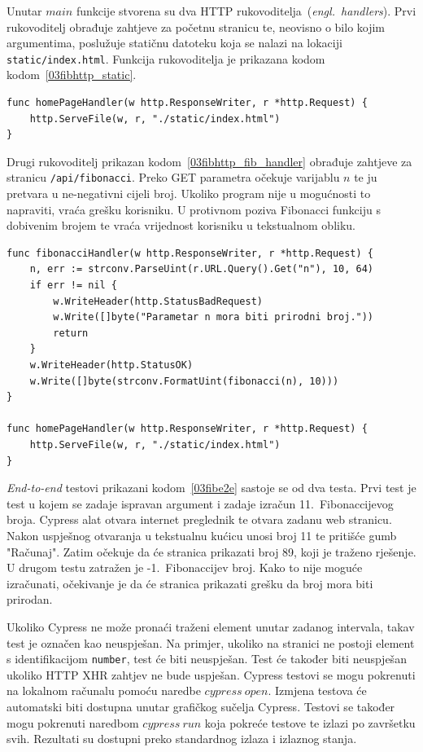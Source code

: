 Unutar $main$ funkcije stvorena su dva HTTP rukovoditelja~(\textit{engl.~handlers}). Prvi
rukovoditelj obrađuje zahtjeve za početnu stranicu te, neovisno o bilo kojim argumentima, poslužuje
statičnu datoteku koja se nalazi na lokaciji \texttt{static/index.html}. Funkcija rukovoditelja je
prikazana kodom kodom~\ref{03fibhttp_static}.
\begin{lstlisting}[float=h]
func homePageHandler(w http.ResponseWriter, r *http.Request) {
	http.ServeFile(w, r, "./static/index.html")
}
\end{lstlisting}

Drugi rukovoditelj prikazan kodom~\ref{03fibhttp_fib_handler} obrađuje zahtjeve za stranicu
\texttt{/api/fibonacci}. Preko GET parametra očekuje varijablu $n$ te ju pretvara u ne-negativni
cijeli broj. Ukoliko program nije u mogućnosti to napraviti, vraća grešku korisniku. U protivnom
poziva Fibonacci funkciju s dobivenim brojem te vraća vrijednost korisniku u tekstualnom obliku.

\begin{lstlisting}[float=h]
func fibonacciHandler(w http.ResponseWriter, r *http.Request) {
	n, err := strconv.ParseUint(r.URL.Query().Get("n"), 10, 64)
	if err != nil {
		w.WriteHeader(http.StatusBadRequest)
		w.Write([]byte("Parametar n mora biti prirodni broj."))
		return
	}
	w.WriteHeader(http.StatusOK)
	w.Write([]byte(strconv.FormatUint(fibonacci(n), 10)))
}

func homePageHandler(w http.ResponseWriter, r *http.Request) {
	http.ServeFile(w, r, "./static/index.html")
}
\end{lstlisting}

\textit{End-to-end} testovi prikazani kodom~\ref{03fibe2e} sastoje se od dva testa. Prvi test je
test u kojem se zadaje ispravan argument i zadaje izračun 11.~Fibonaccijevog broja. Cypress alat
otvara internet preglednik te otvara zadanu web stranicu. Nakon uspješnog otvaranja u tekstualnu
kućicu unosi broj 11 te pritišće gumb "Računaj". Zatim očekuje da će stranica prikazati broj 89,
koji je traženo rješenje. U drugom testu zatražen je -1.~Fibonaccijev broj. Kako to nije moguće
izračunati, očekivanje je da će stranica prikazati grešku da broj mora biti prirodan.

Ukoliko Cypress ne može pronaći traženi element unutar zadanog intervala, takav test je označen kao
neuspješan. Na primjer, ukoliko na stranici ne postoji element s identifikacijom \texttt{number},
test će biti neuspješan. Test će također biti neuspješan ukoliko HTTP XHR zahtjev ne bude uspješan.
Cypress testovi se mogu pokrenuti na lokalnom računalu pomoću naredbe $cypress~open$. Izmjena
testova će automatski biti dostupna unutar grafičkog sučelja Cypress. Testovi se također mogu
pokrenuti naredbom $cypress~run$ koja pokreće testove te izlazi po završetku svih. Rezultati su
dostupni preko standardnog izlaza i izlaznog stanja.

